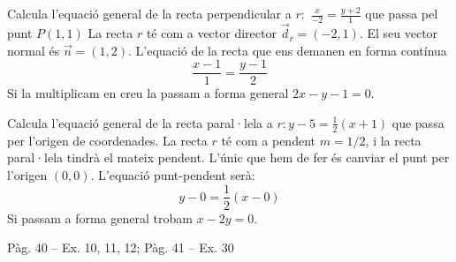 \documentclass[11pt, a4paper, pdf]{article}
\renewcommand{\hot}[1][]{
	\ifthenelse{\equal{#1}{}}{$\mathbf{\bigstar}$ \underline{\textbf{LLIBRE}}: }{\myrepeat{#1}{$\mathbf{\bigstar}$}}
}
\begin{document}
\begin{resolt}[E]{Calcula l'equació general de la recta perpendicular a $r:$ $\frac{x}{-2}=\frac{y+2}{1}$ que passa pel punt $P(1,1)$}
	La recta $r$ té com a vector director $\vec d_r=(-2,1)$. El seu vector normal és $\vec n=(1,2)$. L'equació de la recta que ens demanen en forma contínua 
	\begin{equation*}
	\frac{x-1}{1}=\frac{y-1}{2}
	\end{equation*}
	Si la multiplicam en creu la passam a forma general $2x-y-1=0$.
\end{resolt}
\vspace{-0.5cm}	
\begin{resolt}{Calcula l'equació general de la recta paral·lela a $r:$\linebreak $y-5=\frac{1}{2}(x+1)$ que passa per l'origen de coordenades.}
	La recta $r$ té com a pendent $m=1/2$, i la recta paral·lela tindrà el mateix pendent. L'únic que hem de fer és canviar el punt per l'origen $(0,0)$. L'equació punt-pendent serà:
	\begin{equation*}
	y-0=\frac{1}{2}(x-0)
	\end{equation*}
	Si passam a forma general trobam $x-2y=0$.
\end{resolt}

\hot Pàg. 40 -- Ex. 10, 11, 12; Pàg. 41 -- Ex. 30

\begin{comment}
\begin{mylist}
	
		
	\item  Calculau la recta que és paral·lela a $r$: $\frac{x-1}{2} =\frac{y-2}{3} $ i passa pel punt $\left(0,\; 1\right)$. Expressa-la almenys en tres formes i dibuixa-la.
	
	\item  Calculau la recta que és paral·lela a $r$: $2x-3y=0$ i passa pel punt $\left(1,\; 2\right)$. Expressa-la almenys en tres formes i dibuixa-la.
	
	\item  Calculau una recta perpendicular a $r:$ $y=2x-1$ que passi per $\left(2,\, \, -1\right)$. Expressa-la almenys en tres formes i dibuixa-la.
	
	\item  Calculau una recta perpendicular a $r:$ $x+2y=5$ que passi per $\left(2,\, \, 0\right)$. Troba el punt d'intersecció entre les dues rectes.
	
	\item  Calculau el punt simètric de $P(6,3)$ respecte la recta $r:$ $x+2y-2=0$.
	
\end{mylist}	
\end{comment}
\end{document}
